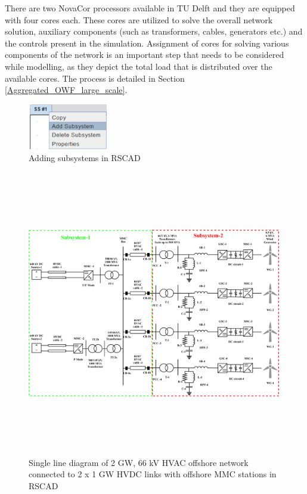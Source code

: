 There are two NovaCor processors available in TU Delft and they are equipped with four cores each. These cores are utilized to solve the overall network solution, auxiliary components (such as transformers, cables, generators etc.) and the controls present in the simulation. Assignment of cores for solving various components of the network is an important step that needs to be considered while modelling, as they depict the total load that is distributed over the available cores. The process is detailed in Section \ref{Aggregated_OWF_large_scale}. 

\begin{figure}[H]
\centering
    \includegraphics[height = 2cm,width = 3.5cm]{Diagrams/Chapter_3/Subsystem.PNG}
    \caption{Adding subsystems in RSCAD}
    \label{fig:subsystem_RSCAD}
\end{figure}

\begin{figure}[H]
\centering
    \includegraphics[height = 12.5cm,width = 17cm]{Diagrams/Chapter_4/WT4_MMC2_new.pdf}
    \caption{Single line diagram of 2 GW, 66 kV HVAC offshore network connected to 2 x 1 GW HVDC links with offshore MMC stations in RSCAD}
    \label{fig:WT4_MMC2}
\end{figure}



